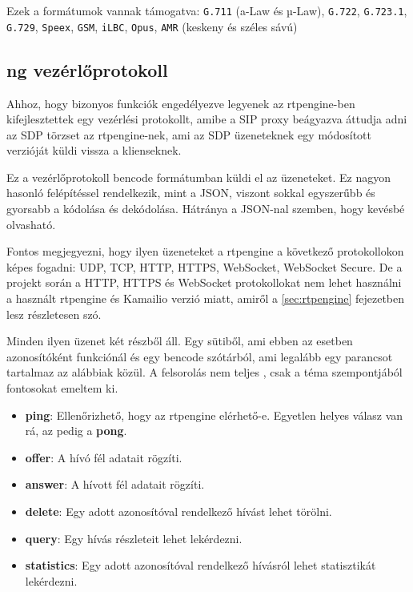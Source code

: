 Ezek a formátumok vannak támogatva: \texttt{G.711} (a-Law és µ-Law), \texttt{G.722}, 
\texttt{G.723.1}, \texttt{G.729}, \texttt{Speex}, \texttt{GSM}, \texttt{iLBC}, 
\texttt{Opus}, \texttt{AMR} (keskeny és széles sávú)

\subsection{ng vezérlőprotokoll}

Ahhoz, hogy bizonyos funkciók engedélyezve legyenek az rtpengine-ben kifejlesztettek 
egy vezérlési protokollt, amibe a SIP proxy beágyazva áttudja adni az SDP törzset 
az rtpengine-nek, ami az SDP üzeneteknek egy módosított verzióját küldi vissza a 
klienseknek.

Ez a vezérlőprotokoll bencode formátumban küldi el az üzeneteket. Ez nagyon hasonló
felépítéssel rendelkezik, mint a JSON, viszont sokkal egyszerűbb és gyorsabb a kódolása 
és dekódolása. Hátránya a JSON-nal szemben, hogy kevésbé olvasható.

Fontos megjegyezni, hogy ilyen üzeneteket a rtpengine a következő protokollokon képes fogadni: UDP, TCP, HTTP, HTTPS, WebSocket, WebSocket Secure. De a projekt során a 
HTTP, HTTPS és WebSocket protokollokat nem lehet használni a használt rtpengine és 
Kamailio verzió miatt, amiről a \ref{sec:rtpengine} fejezetben lesz részletesen szó.

Minden ilyen üzenet két részből áll. Egy sütiből, ami ebben az esetben azonosítóként
funkciónál és egy bencode szótárból, ami legalább egy parancsot tartalmaz az 
alábbiak közül. A felsorolás nem teljes \cite{rtpengineng}, csak a téma szempontjából 
fontosokat emeltem ki.

\begin{itemize}
	\item \textbf{ping}: Ellenőrizhető, hogy az rtpengine elérhető-e. Egyetlen helyes 
	válasz van rá, az pedig a \textbf{pong}.
	\item \textbf{offer}: A hívó fél adatait rögzíti.
	\item \textbf{answer}: A hívott fél adatait rögzíti. 
	\item \textbf{delete}: Egy adott azonosítóval rendelkező hívást lehet törölni.
	\item \textbf{query}: Egy hívás részleteit lehet lekérdezni. 
	\item \textbf{statistics}: Egy adott azonosítóval rendelkező hívásról lehet 
	statisztikát lekérdezni. 
\end{itemize} 

